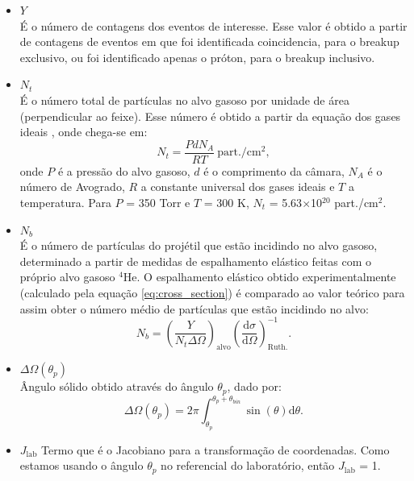 \documentclass[a4paper,12pt,oneside]{book}
\begin{document}
\begin{itemize}
	\item $Y$ \hfill \\
    	É o número de contagens dos eventos de interesse. Esse valor é obtido a partir de contagens de eventos em que foi identificada coincidencia, para o breakup exclusivo, ou foi identificado apenas o próton, para o breakup inclusivo.
	\item $N_t$ \hfill \\
		É o número total de partículas no alvo gasoso por unidade de área (perpendicular ao feixe). Esse número é obtido a partir da equação dos gases ideais \cite{termo_mario}, onde chega-se em:
		\begin{equation}
			N_t = \frac{PdN_A}{RT} \: \mathrm{part./cm^2},
		\end{equation}
		onde $P$ é a pressão do alvo gasoso, $d$ é o comprimento da câmara, $N_A$ é o número de Avogrado, $R$ a constante universal dos gases ideais e $T$ a temperatura. Para $P$ = 350 Torr e $T$ = 300 K, $N_t$ = 5.63$\times$10$^{20}$ part./cm$^2$.
	\item $N_b$ \hfill \\
		É o número de partículas do projétil que estão incidindo no alvo gasoso, determinado a partir de medidas de espalhamento elástico feitas com o próprio alvo gasoso $^4$He. O espalhamento elástico obtido experimentalmente (calculado pela equação \ref{eq:cross_section}) é comparado ao valor teórico para assim obter o número médio de partículas que estão incidindo no alvo:
		\begin{equation}
			N_b = \left( \frac{Y}{N_t \Delta\Omega}\right)_{\mathrm{alvo}} \left(\frac{\mathrm{d}\sigma}{\mathrm{d}\Omega}\right)^{-1}_{\mathrm{Ruth.}}.
		\end{equation}		 
	\item $\Delta\Omega(\theta_p)$  \hfill \\
	Ângulo sólido obtido através do ângulo $\theta_p$, dado por:
	\begin{equation}
	\Delta\Omega (\theta_p) = 2\pi \int_{\theta_p}^{\theta_p + \theta_{bin}}\sin(\theta)\mathrm{d}\theta.		
	\end{equation}
	
	\item $J_{\mathrm{lab}}$
	Termo que é o Jacobiano para a transformação de coordenadas. Como estamos usando o ângulo $\theta_p$ no referencial do laboratório, então $J_{\mathrm{lab}}$ = 1. 	
	
\end{itemize}
\end{document}
